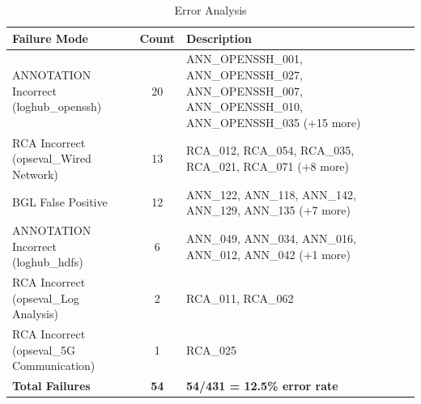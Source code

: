 \begin{table}[h]
\centering
\caption{Error Analysis}
\label{tab:error-analysis}
\begin{tabular}{lcp{8cm}}
\toprule
\textbf{Failure Mode} & \textbf{Count} & \textbf{Description} \\
\midrule
ANNOTATION Incorrect (loghub_openssh) & 20 & ANN_OPENSSH_001, ANN_OPENSSH_027, ANN_OPENSSH_007, ANN_OPENSSH_010, ANN_OPENSSH_035 (+15 more) \\
RCA Incorrect (opseval_Wired Network) & 13 & RCA_012, RCA_054, RCA_035, RCA_021, RCA_071 (+8 more) \\
BGL False Positive & 12 & ANN_122, ANN_118, ANN_142, ANN_129, ANN_135 (+7 more) \\
ANNOTATION Incorrect (loghub_hdfs) & 6 & ANN_049, ANN_034, ANN_016, ANN_012, ANN_042 (+1 more) \\
RCA Incorrect (opseval_Log Analysis) & 2 & RCA_011, RCA_062 \\
RCA Incorrect (opseval_5G Communication) & 1 & RCA_025 \\
\midrule
\textbf{Total Failures} & \textbf{54} & \textbf{54/431 = 12.5\% error rate} \\
\bottomrule
\end{tabular}
\end{table}

